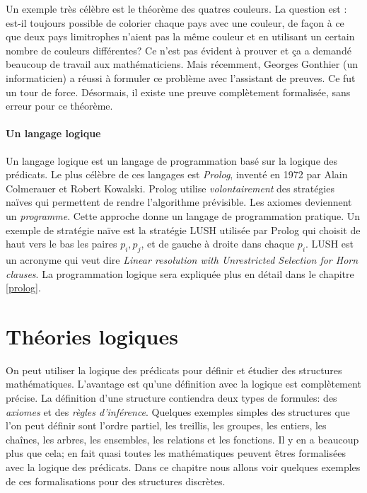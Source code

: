 {Un exemple très célèbre est le théorème des quatres couleurs. La question est : est-il toujours possible de colorier chaque pays avec une couleur, de façon à ce que deux pays limitrophes n'aient pas la même couleur et en utilisant un certain nombre de couleurs différentes? Ce n'est pas évident à prouver et ça a demandé beaucoup de travail aux mathématiciens. Mais récemment, Georges Gonthier (un informaticien) a réussi à formuler ce problème avec l'assistant de preuves. Ce fut un tour de force. Désormais, il existe une preuve complètement formalisée, sans erreur pour ce théorème.

\subsubsection{Un langage logique}

Un langage logique est un langage de programmation basé sur la logique des prédicats.
Le plus célèbre de ces langages est {\em Prolog}, inventé en 1972 par Alain Colmerauer et Robert Kowalski.
Prolog utilise {\em volontairement} des stratégies naïves qui permettent de rendre l'algorithme prévisible.
Les axiomes deviennent un {\em programme}.
Cette approche donne un langage de programmation pratique.
Un exemple de stratégie naïve est la stratégie LUSH utilisée par Prolog
qui choisit de haut vers le bas les paires $p_i, p_j$,
et de gauche à droite dans chaque $p_i$.
LUSH est un acronyme qui veut dire {\em Linear resolution with Unrestricted Selection for Horn clauses}.
La programmation logique sera expliquée plus en détail dans le chapitre \ref{prolog}.


\chapter{Théories logiques}

On peut utiliser la logique des prédicats pour définir et étudier des structures mathématiques.
L'avantage est qu'une définition avec la logique est complètement précise.
La définition d'une structure contiendra deux types de formules:
des {\em axiomes} et des {\em règles d'inférence}.
Quelques exemples simples des structures que l'on peut définir sont
l'ordre partiel, les treillis, les groupes, les entiers, les chaînes, les arbres,
les ensembles, les relations et les fonctions.
Il y en a beaucoup plus que cela; en fait quasi toutes les mathématiques
peuvent êtres formalisées avec la logique des prédicats.
Dans ce chapitre nous allons voir quelques exemples de ces formalisations
pour des structures discrètes.

}

